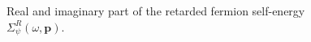 \vspace{1cm}

\begin{figure}[h]
	\centering
	\caption[Fermion self-energy]{Real and imaginary part of the retarded fermion self-energy $\Sigma^{R}_{\psi}(\omega,\bm{p})$.}
	\label{fig:fermion-self-energy}
\end{figure}